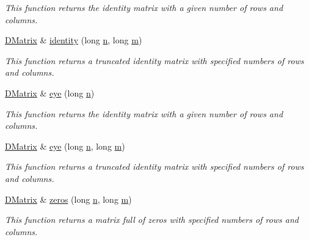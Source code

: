 \begin{DoxyCompactItemize}
\begin{DoxyCompactList}\small\item\em This function returns the identity matrix with a given number of rows and columns. \item\end{DoxyCompactList}\item 
\hyperlink{classDMatrix}{DMatrix} \& \hyperlink{classDMatrix_ab54dc58f34aa18e7ff82b21b3533b173}{identity} (long \hyperlink{classDMatrix_a6b7668991ff7d01230b3599836a5d682}{n}, long \hyperlink{classDMatrix_a9cb55e3ad06f81025fed1ffbb0ae28bd}{m})
\begin{DoxyCompactList}\small\item\em This function returns a truncated identity matrix with specified numbers of rows and columns. \item\end{DoxyCompactList}\item 
\hyperlink{classDMatrix}{DMatrix} \& \hyperlink{classDMatrix_aafc7c944155ff0404f3201ce8b764bea}{eye} (long \hyperlink{classDMatrix_a6b7668991ff7d01230b3599836a5d682}{n})
\begin{DoxyCompactList}\small\item\em This function returns the identity matrix with a given number of rows and columns. \item\end{DoxyCompactList}\item 
\hyperlink{classDMatrix}{DMatrix} \& \hyperlink{classDMatrix_aee7a643a65d88ae71a19462563fb9805}{eye} (long \hyperlink{classDMatrix_a6b7668991ff7d01230b3599836a5d682}{n}, long \hyperlink{classDMatrix_a9cb55e3ad06f81025fed1ffbb0ae28bd}{m})
\begin{DoxyCompactList}\small\item\em This function returns a truncated identity matrix with specified numbers of rows and columns. \item\end{DoxyCompactList}\item 
\hyperlink{classDMatrix}{DMatrix} \& \hyperlink{classDMatrix_a2150db6f40794cd7741043bcd593d2ce}{zeros} (long \hyperlink{classDMatrix_a6b7668991ff7d01230b3599836a5d682}{n}, long \hyperlink{classDMatrix_a9cb55e3ad06f81025fed1ffbb0ae28bd}{m})
\begin{DoxyCompactList}\small\item\em This function returns a matrix full of zeros with specified numbers of rows and columns. \item\end{DoxyCompactList}\item 

\end{DoxyCompactItemize}
